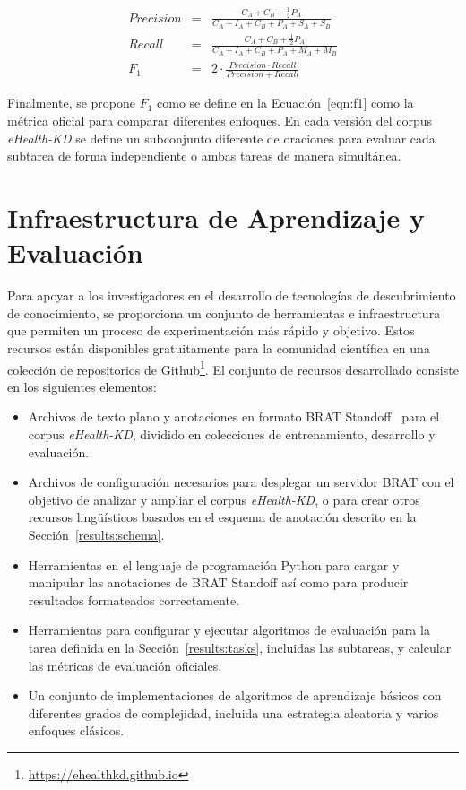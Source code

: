 \begin{eqnarray}
    Precision & = & \frac{C_A + C_B + \frac{1}{2} P_A}{C_A + I_A + C_B + P_A + S_A + S_B} \\
    Recall    & = & \frac{C_A + C_B + \frac{1}{2} P_A}{C_A + I_A + C_B + P_A + M_A + M_B} \\
    F_1       & = & 2 \cdot \frac{Precision \cdot Recall}{Precision + Recall} \label{eqn:f1}
\end{eqnarray}{}

Finalmente, se propone $F_1$ como se define en la Ecuación~\ref{eqn:f1} como la métrica oficial para comparar diferentes enfoques. En cada versión del corpus \textit{eHealth-KD} se define un subconjunto diferente de oraciones para evaluar cada subtarea de forma independiente o ambas tareas de manera simultánea.

\section{Infraestructura de Aprendizaje y Evaluación}\label{results:infrastructure}

Para apoyar a los investigadores en el desarrollo de tecnologías de descubrimiento de conocimiento, se proporciona un conjunto de herramientas e infraestructura que permiten un proceso de experimentación más rápido y objetivo.
Estos recursos están disponibles gratuitamente para la comunidad científica en una colección de repositorios de Github\footnote{\url{https://ehealthkd.github.io}}.
El conjunto de recursos desarrollado consiste en los siguientes elementos:

\begin{itemize}
    \item Archivos de texto plano y anotaciones en formato BRAT Standoff~\cite{brat} para el corpus \textit{eHealth-KD}, dividido en colecciones de entrenamiento, desarrollo y evaluación.
    \item Archivos de configuración necesarios para desplegar un servidor BRAT con el objetivo de analizar y ampliar el corpus \textit{eHealth-KD}, o para crear otros recursos lingüísticos basados en el esquema de anotación descrito en la Sección~\ref{results:schema}.
    \item Herramientas en el lenguaje de programación Python para cargar y manipular las anotaciones de BRAT Standoff así como para producir resultados formateados correctamente.
    \item Herramientas para configurar y ejecutar algoritmos de evaluación para la tarea definida en la Sección~\ref{results:tasks}, incluidas las subtareas, y calcular las métricas de evaluación oficiales.
    \item Un conjunto de implementaciones de algoritmos de aprendizaje básicos con diferentes grados de complejidad, incluida una estrategia aleatoria y varios enfoques clásicos.
\end{itemize}

